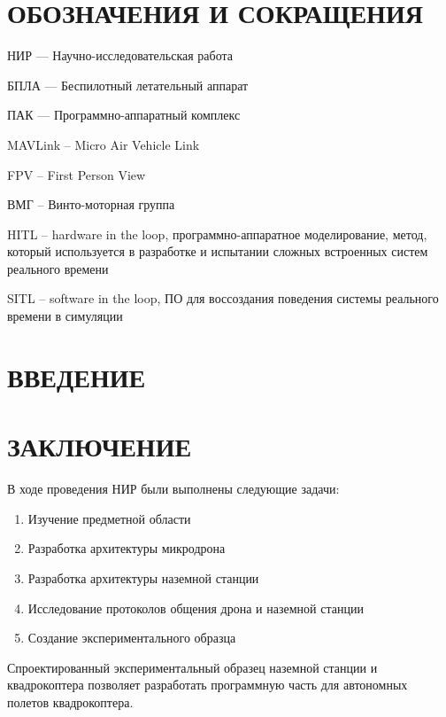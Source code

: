\documentclass[a4paper,12pt]{article}
\begin{document}
\pagebreak

\section*{\centering ОБОЗНАЧЕНИЯ И СОКРАЩЕНИЯ}

НИР --- Научно-исследовательская работа

БПЛА --- Беспилотный летательный аппарат

ПАК --- Программно-аппаратный комплекс

MAVLink -- Micro Air Vehicle Link

FPV -- First Person View

ВМГ -- Винто-моторная группа

HITL -- hardware in the loop, программно-аппаратное моделирование, метод, который используется в разработке и испытании сложных встроенных систем реального времени

SITL -- software in the loop, ПО для воссоздания поведения системы реального времени в симуляции
\pagebreak

\tableofcontents

\pagebreak

\section*{\centering ВВЕДЕНИЕ}
\pagebreak
\pagebreak
\pagebreak
\pagebreak
\pagebreak
\pagebreak
\pagebreak

\section*{\centering ЗАКЛЮЧЕНИЕ}
В ходе проведения НИР были выполнены следующие задачи:
\begin{enumerate} 
	\item Изучение предметной области
	\item Разработка архитектуры микродрона
	\item Разработка архитектуры наземной станции
	\item Исследование протоколов общения дрона и наземной станции
	\item Создание экспериментального образца
\end{enumerate}
Спроектированный экспериментальный образец наземной станции и квадрокоптера позволяет разработать программную часть для автономных полетов квадрокоптера.
\pagebreak

\printbibliography

\pagebreak
\end{document}
